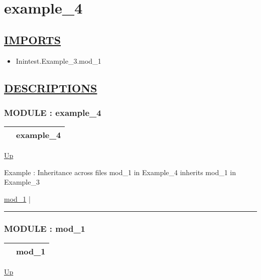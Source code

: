 \chapter*{example\_4}
\hypertarget{ecldoc:toc:example_4}{}

\section*{\underline{IMPORTS}}
\begin{itemize}
\item Inintest.Example\_3.mod\_1
\end{itemize}

\section*{\underline{DESCRIPTIONS}}
\subsection*{MODULE : example\_4}
\hypertarget{ecldoc:example_4}{}

{\renewcommand{\arraystretch}{1.5}
\begin{tabularx}{\textwidth}{|>{\raggedright\arraybackslash}l|X|}
\hline
\hspace{0pt} & example\_4 \\
\hline
\end{tabularx}
}

\hyperlink{ecldoc:toc:root}{Up}

\par
Example : Inheritance across files mod\_1 in Example\_4 inherits mod\_1 in Example\_3


\hyperlink{ecldoc:example_4.mod_1}{mod\_1}  |

\rule{\textwidth}{0.4pt}

\subsection*{MODULE : mod\_1}
\hypertarget{ecldoc:example_4.mod_1}{}

{\renewcommand{\arraystretch}{1.5}
\begin{tabularx}{\textwidth}{|>{\raggedright\arraybackslash}l|X|}
\hline
\hspace{0pt} & mod\_1 \\
\hline
\end{tabularx}
}

\hyperlink{ecldoc:example_4}{Up}

